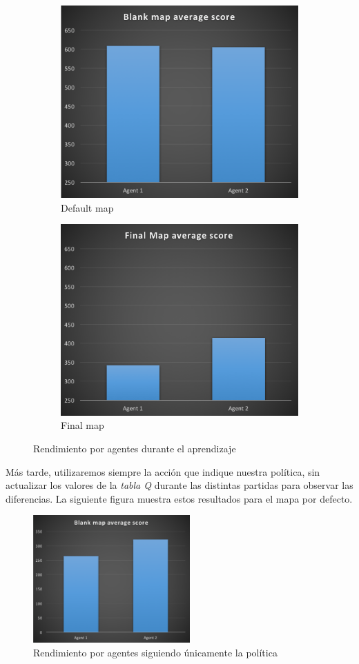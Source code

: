\documentclass[12pt]{article}
\begin{document}
\begin{figure}[h]
    \centering
    \begin{subfigure}{.5\textwidth}
        \centering
        \includegraphics[width=.7\linewidth]{bmap_a}
        \caption{Default map}
        \label{fig:sub1}
    \end{subfigure}%
    \begin{subfigure}{.5\textwidth}
        \centering
        \includegraphics[width=.7\linewidth]{fmap_a}
        \caption{Final map}
        \label{fig:sub2}
    \end{subfigure}
    \caption{Rendimiento por agentes durante el aprendizaje}
    \label{fig:test}
\end{figure}

Más tarde, utilizaremos siempre la acción que indique nuestra política, sin actualizar los valores de la \textit{tabla Q} durante las distintas partidas para observar las diferencias. La siguiente figura muestra estos resultados para el mapa por defecto.

\begin{figure}[h]
    \centering
    \includegraphics[width=6cm]{bmap_b}
    \caption{Rendimiento por agentes siguiendo únicamente la política}
\end{figure}
\end{document}
